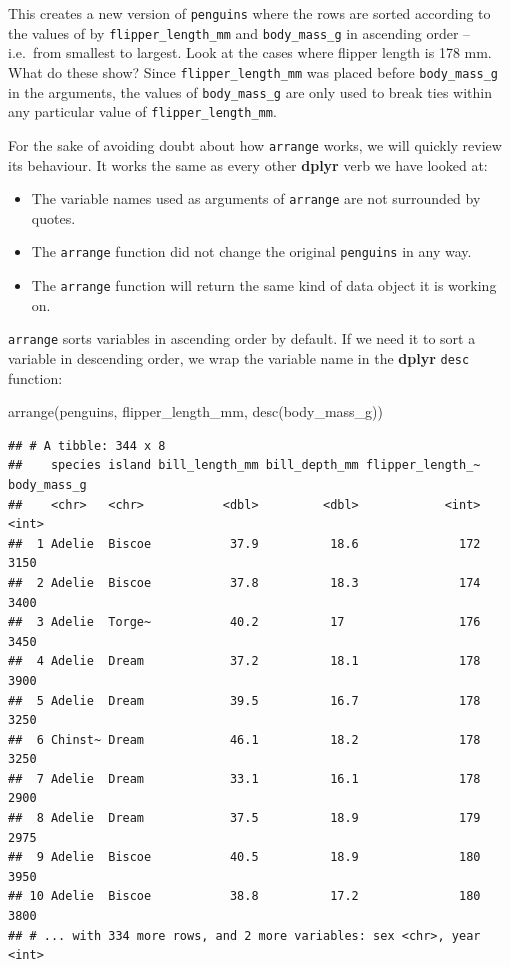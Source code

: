 \documentclass[
]{book}
\newenvironment{Shaded}{\begin{snugshade}}{\end{snugshade}}
\newcommand{\FunctionTok}[1]{\textcolor[rgb]{0.00,0.00,0.00}{#1}}
\newcommand{\NormalTok}[1]{#1}
\providecommand{\tightlist}{%
  \setlength{\itemsep}{0pt}\setlength{\parskip}{0pt}}
\begin{document}
This creates a new version of \texttt{penguins} where the rows are sorted according to the values of by \texttt{flipper\_length\_mm} and \texttt{body\_mass\_g} in ascending order -- i.e.~from smallest to largest. Look at the cases where flipper length is 178 mm. What do these show? Since \texttt{flipper\_length\_mm} was placed before \texttt{body\_mass\_g} in the arguments, the values of \texttt{body\_mass\_g} are only used to break ties within any particular value of \texttt{flipper\_length\_mm}.

For the sake of avoiding doubt about how \texttt{arrange} works, we will quickly review its behaviour. It works the same as every other \textbf{dplyr} verb we have looked at:

\begin{itemize}
\tightlist
\item
  The variable names used as arguments of \texttt{arrange} are not surrounded by quotes.
\item
  The \texttt{arrange} function did not change the original \texttt{penguins} in any way.
\item
  The \texttt{arrange} function will return the same kind of data object it is working on.
\end{itemize}

\texttt{arrange} sorts variables in ascending order by default. If we need it to sort a variable in descending order, we wrap the variable name in the \textbf{dplyr} \texttt{desc} function:

\begin{Shaded}
\begin{Highlighting}[]
\FunctionTok{arrange}\NormalTok{(penguins, flipper\_length\_mm, }\FunctionTok{desc}\NormalTok{(body\_mass\_g))}
\end{Highlighting}
\end{Shaded}

\begin{verbatim}
## # A tibble: 344 x 8
##    species island bill_length_mm bill_depth_mm flipper_length_~ body_mass_g
##    <chr>   <chr>           <dbl>         <dbl>            <int>       <int>
##  1 Adelie  Biscoe           37.9          18.6              172        3150
##  2 Adelie  Biscoe           37.8          18.3              174        3400
##  3 Adelie  Torge~           40.2          17                176        3450
##  4 Adelie  Dream            37.2          18.1              178        3900
##  5 Adelie  Dream            39.5          16.7              178        3250
##  6 Chinst~ Dream            46.1          18.2              178        3250
##  7 Adelie  Dream            33.1          16.1              178        2900
##  8 Adelie  Dream            37.5          18.9              179        2975
##  9 Adelie  Biscoe           40.5          18.9              180        3950
## 10 Adelie  Biscoe           38.8          17.2              180        3800
## # ... with 334 more rows, and 2 more variables: sex <chr>, year <int>
\end{verbatim}
\end{document}
